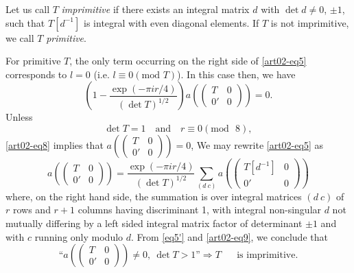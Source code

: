 Let us call $T$ {\em imprimitive} if there exists an integral matrix
$d$ with $\det d\neq 0$, $\pm 1$, such that $T[d^{-1}]$ is integral
with even diagonal elements. If $T$ is not imprimitive, we call $T$
{\em primitive}.

For primitive $T$, the only term occurring on the right side
of \eqref{art02-eq5} corresponds to $l=0$ (i.e. $l\equiv 0(\text{mod~
}T)$). In this case then, we have
\begin{equation}
\left(1-
\frac{\exp(-\pi ir/4)}{(\det T)^{1/2}}\right)a
\left(
\begin{pmatrix}
T & 0\\
0' & 0
\end{pmatrix}
\right)=0.\label{art02-eq8}
\end{equation}
Unless
\begin{equation}
\det T=1\quad\text{and}\quad r\equiv 0(\text{mod~ }8),\label{art02-eq9}
\end{equation}
\eqref{art02-eq8} implies that $a\left(\left(\begin{smallmatrix} T &
0\\ 0' & 0\end{smallmatrix}\right)\right)=0$, We may
rewrite \eqref{art02-eq5} as 
\begin{equation*}
a\left(
\begin{pmatrix}
T & 0\\
0' & 0
\end{pmatrix}
\right)=
\frac{\exp (-\pi ir/4)}{(\det T)^{1/2}}\sum_{(d\ c)}a\left(
\begin{pmatrix}
T[d^{-1}] & 0\\
0' & 0
\end{pmatrix}
\right)\tag{$5'$}\label{eq5'}
\end{equation*}\pageoriginale 
where, on the right hand side, the summation is over integral matrices
$(d\ c)$ of $r$ rows and $r+1$ columns having discriminant 1, with
integral non-singular $d$ not mutually differing by a left sided
integral matrix factor of determinant $\pm 1$ and with $c$ running
only modulo $d$. From \eqref{eq5'} and \eqref{art02-eq9}, we conclude that
\begin{equation}
\text{``} a
\left(
\begin{pmatrix}
T & 0\\
0' & 0
\end{pmatrix}
\right)\neq 0, \ \det T>1\text{''}\Rightarrow T\quad\text{~ is
imprimitive.}\label{art02-eq10}
\end{equation}

